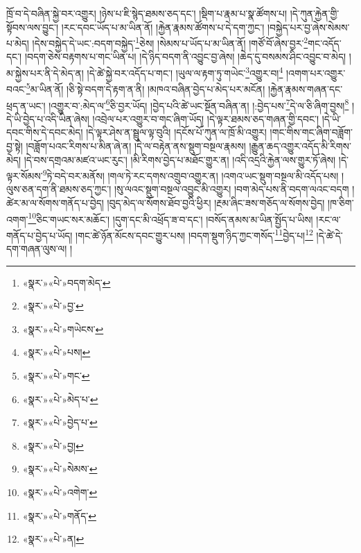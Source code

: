ཁྲོ་བ་དེ་བཞིན་སྐྱེ་བར་འགྱུར། །ཉེས་པ་ཇི་སྙེད་ཐམས་ཅད་དང་། །སྡིག་པ་རྣམ་པ་སྣ་ཚོགས་པ། །དེ་ཀུན་རྐྱེན་གྱི་སྟོབས་ལས་བྱུང་། །རང་དབང་ཡོད་པ་མ་ཡིན་ནོ། །རྐྱེན་རྣམས་ཚོགས་པ་དེ་དག་ཀྱང་། །བསྐྱེད་པར་བྱ་ཞེས་སེམས་པ་མེད། །དེས་བསྐྱེད་དེ་ཡང་:བདག་བསྐྱེད་\footnote{«སྣར་»«པེ་»བདག་མེད་}ཅེས། །སེམས་པ་ཡོད་པ་མ་ཡིན་ནོ། །གཙོ་བོ་ཞེས་བྱར་\footnote{«སྣར་»«པེ་»བྱ་}གང་འདོད་དང་། །བདག་ཅེས་བརྟགས་པ་གང་ཡིན་པ། །དེ་ཉིད་བདག་ནི་འབྱུང་བྱ་ཞེས། །ཆེད་དུ་བསམས་ཤིང་འབྱུང་བ་མེད། །མ་སྐྱེས་པར་ནི་དེ་མེད་ན། །དེ་ཚེ་སྐྱེ་བར་འདོད་པ་གང་། །ཡུལ་ལ་རྟག་ཏུ་གཡེང་\footnote{«སྣར་»«པེ་»གཡེངས་}འགྱུར་བ།\footnote{«སྣར་»«པེ་»པས།} །འགག་པར་འགྱུར་བའང་\footnote{«སྣར་»«པེ་»གང་}མ་ཡིན་ནོ། །ཅི་སྟེ་བདག་དེ་རྟག་ན་ནི། །མཁའ་བཞིན་བྱེད་པ་མེད་པར་མངོན། །རྐྱེན་རྣམས་གཞན་དང་ཕྲད་ན་ཡང་། །འགྱུར་བ་:མེད་ལ་\footnote{«སྣར་»«པེ་»མེད་པ་}ཅི་བྱར་ཡོད། །བྱེད་པའི་ཚེ་ཡང་སྔོན་བཞིན་ན། །:བྱེད་པས་\footnote{«སྣར་»«པེ་»བྱེད་པ་}དེ་ལ་ཅི་ཞིག་བྱས།\footnote{«སྣར་»«པེ་»བྱ།} །དེ་ཡི་བྱེད་པ་འདི་ཡིན་ཞེས། །འབྲེལ་པར་འགྱུར་བ་གང་ཞིག་ཡོད། །དེ་ལྟར་ཐམས་ཅད་གཞན་གྱི་དབང་། །དེ་ཡི་དབང་གིས་དེ་དབང་མེད། །དེ་ལྟར་ཤེས་ན་སྦྲུལ་ལྟ་བུའི། །དངོས་པོ་ཀུན་ལ་ཁྲོ་མི་འགྱུར། །གང་གིས་གང་ཞིག་བཟློག་བྱ་སྟེ། །བཟློག་པའང་རིགས་པ་མིན་ཞེ་ན། །དེ་ལ་བརྟེན་ནས་སྡུག་བསྔལ་རྣམས། །རྒྱུན་ཆད་འགྱུར་འདོད་མི་རིགས་མེད། །དེ་བས་དགྲའམ་མཛའ་ཡང་རུང་། །མི་རིགས་བྱེད་པ་མཐོང་གྱུར་ན། །འདི་འདྲའི་རྐྱེན་ལས་གྱུར་ཏོ་ཞེས། །དེ་ལྟར་སོམས་\footnote{«སྣར་»«པེ་»སེམས་}ཏེ་བདེ་བར་མནོས། །གལ་ཏེ་རང་དགས་འགྲུབ་འགྱུར་ན། །འགའ་ཡང་སྡུག་བསྔལ་མི་འདོད་པས། །ལུས་ཅན་དག་ནི་ཐམས་ཅད་ཀྱང་། །སུ་ལའང་སྡུག་བསྔལ་འབྱུང་མི་འགྱུར། །བག་མེད་པས་ནི་བདག་ལའང་བདག །ཚེར་མ་ལ་སོགས་གནོད་པ་བྱེད། །བུད་མེད་ལ་སོགས་ཐོབ་བྱའི་ཕྱིར། །རྔམ་ཞིང་ཟས་གཅོད་ལ་སོགས་བྱེད། །ཁ་ཅིག་འགག་\footnote{«སྣར་»«པེ་»འགེག་}ཅིང་གཡང་སར་མཆོང་། །དུག་དང་མི་འཕྲོད་ཟ་བ་དང་། །བསོད་ནམས་མ་ཡིན་སྤྱོད་པ་ཡིས། །རང་ལ་གནོད་པ་བྱེད་པ་ཡོད། །གང་ཚེ་ཉོན་མོངས་དབང་གྱུར་པས། །བདག་སྡུག་ཉིད་ཀྱང་གསོད་\footnote{«སྣར་»«པེ་»གནོད་}བྱེད་པ།\footnote{«སྣར་»«པེ་»ན།} །དེ་ཚེ་དེ་དག་གཞན་ལུས་ལ། །
